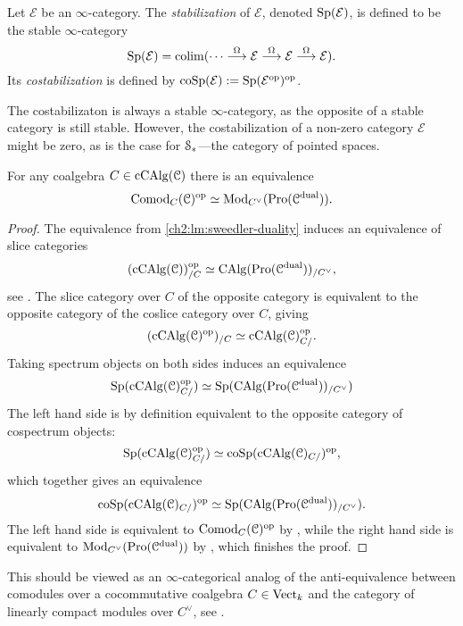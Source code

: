 \begin{definition}
    Let $\mathcal{E}$ be an $\infty$-category. The \emph{stabilization} of $\mathcal{E}$, denoted $\mathrm{Sp}(\mathcal{E})$, is defined to be the stable $\infty$-category 
    \[\mathrm{Sp}(\mathcal{E}) = \operatorname{colim} (\cdots\overset{\Omega}{\longrightarrow}\mathcal{E}\overset{\Omega}{\longrightarrow}\mathcal{E}\overset{\Omega}{\longrightarrow}\mathcal{E}).\] 
    Its \emph{costabilization} is defined by $\mathrm{coSp}(\mathcal{E}):= \mathrm{Sp}(\mathcal{E}^{\mathrm{op}})^{\mathrm{op}}$. 
\end{definition}

The costabilizaton is always a stable $\infty$-category, as the opposite of a stable category is still stable. However, the costabilization of a non-zero category $\mathcal{E}$ might be zero, as is the case for $\EuScript{S}_*$---the category of pointed spaces. 

\begin{proposition}
    \label{ch2:prop:comodules-and-promodules}
    For any coalgebra $C\in \operatorname{cCAlg}(\EuScript{C})$ there is an equivalence 
    \[\mathrm{Comod}_C(\EuScript{C})^{\mathrm{op}}\simeq \mathrm{Mod}_{C^\vee}(\operatorname{Pro}(\EuScript{C}^{\mathrm{dual}})).\]  
\end{proposition}
\begin{proof}
    The equivalence from \cref{ch2:lm:sweedler-duality} induces an equivalence of slice categories 
    \[(\operatorname{cCAlg}(\EuScript{C}))_{/C}^{\mathrm{op}} \simeq \operatorname{CAlg}(\operatorname{Pro}(\EuScript{C}^{\mathrm{dual}}))_{/C^\vee},\]
    see \cite[5.2.5.1]{lurie_09}. The slice category over $C$ of the opposite category is equivalent to the opposite category of the coslice category over $C$, giving 
    \[(\operatorname{cCAlg}(\EuScript{C})^{\mathrm{op}})_{/C} \simeq \operatorname{cCAlg}(\EuScript{C})^{\mathrm{op}}_{C/}.\]
    Taking spectrum objects on both sides induces an equivalence
    \[\mathrm{Sp}(\operatorname{cCAlg}(\EuScript{C})_{C/}^{\mathrm{op}})\simeq \mathrm{Sp}(\operatorname{CAlg}(\operatorname{Pro}(\EuScript{C}^{\mathrm{dual}}))_{/C^\vee})\]
    The left hand side is by definition equivalent to the opposite category of cospectrum objects:
    \[\mathrm{Sp}(\operatorname{cCAlg}(\EuScript{C})_{C/}^{\mathrm{op}})\simeq \mathrm{coSp}(\operatorname{cCAlg}(\EuScript{C})_{C/})^{\mathrm{op}},\]
    which together gives an equivalence
    \[\mathrm{coSp}(\operatorname{cCAlg}(\EuScript{C})_{C/})^{\mathrm{op}} \simeq \mathrm{Sp}(\operatorname{CAlg}(\operatorname{Pro}(\EuScript{C}^{\mathrm{dual}}))_{/C^\vee}).\]
    The left hand side is equivalent to $\mathrm{Comod}_C(\EuScript{C})^{\mathrm{op}}$ by \cite[1.0.3]{chen_2024}, while the right hand side is equivalent to $\mathrm{Mod}_{C^\vee}(\operatorname{Pro}(\EuScript{C}^{\mathrm{dual}}))$ by \cite[7.3.4.13]{Lurie_HA}, which finishes the proof.  
\end{proof}

\begin{remark}
    This should be viewed as an $\infty$-categorical analog of the anti-equivalence between comodules over a cocommutative coalgebra $C\in \mathrm{Vect}_k$ and the category of linearly compact modules over $C^\vee$, see \cite[II.29]{lefschetz_1942}. 
\end{remark}

